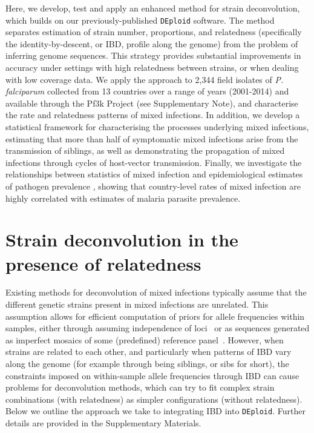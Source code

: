 \documentclass[9pt,lineno]{elife}
\begin{document}

Here, we develop, test and apply an enhanced method for strain deconvolution, which builds on our previously-published \texttt{DEploid} software.  The method separates estimation of strain number, proportions, and relatedness (specifically the identity-by-descent, or IBD, profile along the genome) from the problem of inferring genome sequences. This strategy provides substantial improvements in accuracy under settings with high relatedness between strains, or when dealing with low coverage data.  We apply the approach to 2,344 field isolates of {\it P. falciparum} collected from 13 countries over a range of years (2001-2014) and available through the Pf3k Project (see Supplementary Note), and characterise the rate and relatedness patterns of mixed infections.  In addition, we develop a statistical framework for characterising the processes underlying mixed infections, estimating that more than half of symptomatic mixed infections arise from the transmission of siblings, as well as demonstrating the propagation of mixed infections through cycles of host-vector transmission.  Finally, we investigate the relationships between statistics of mixed infection and epidemiological estimates of pathogen prevalence \citep{MAP2017}, showing that country-level rates of mixed infection are highly correlated with estimates of malaria parasite prevalence.

\section{Strain deconvolution in the presence of relatedness}

Existing methods for deconvolution of mixed infections typically assume that the different genetic strains present in mixed infections are unrelated.  This assumption allows for efficient computation of priors for allele frequencies within samples, either through assuming independence of loci~\citep{Jack2016} or as sequences generated as imperfect mosaics of some (predefined) reference panel~\citep{Zhu2017}.  However, when strains are related to each other, and particularly when patterns of IBD vary along the genome (for example through being siblings, or sibs for short), the constraints imposed on within-sample allele frequencies through IBD can cause problems for deconvolution methods, which can try to fit complex strain combinations (with relatedness) as simpler configurations (without relatedness).  Below we outline the approach we take to integrating IBD into \texttt{DEploid}.  Further details are provided in the Supplementary Materials.
\end{document}
